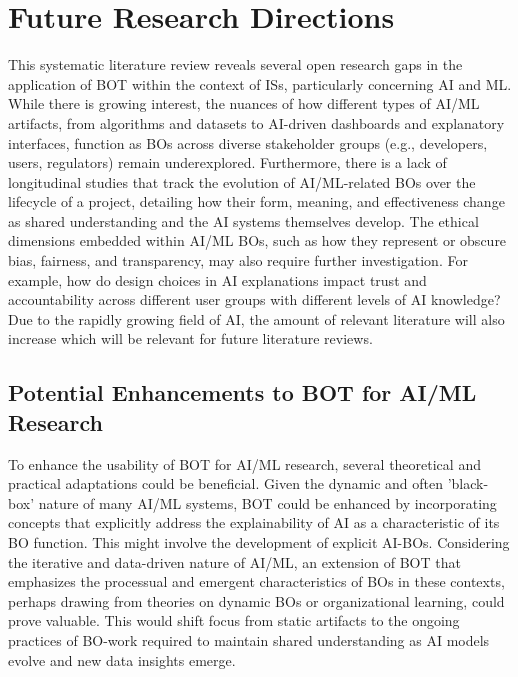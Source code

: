 \documentclass[12pt,oneside]{article}
\begin{document}
\section{Future Research Directions} \label{future-research-directions}

This systematic literature review reveals several open research gaps in the application of \ac{BOT} within the context of \ac{IS}s, particularly concerning \ac{AI} and \ac{ML}. While there is growing interest, the nuances of how different types of \ac{AI}/\ac{ML} artifacts, from algorithms and datasets to \ac{AI}-driven dashboards and explanatory interfaces, function as \ac{BO}s across diverse stakeholder groups (e.g., developers, users, regulators) remain underexplored. Furthermore, there is a lack of longitudinal studies that track the evolution of \ac{AI}/\ac{ML}-related \ac{BO}s over the lifecycle of a project, detailing how their form, meaning, and effectiveness change as shared understanding and the \ac{AI} systems themselves develop. The ethical dimensions embedded within \ac{AI}/\ac{ML} \ac{BO}s, such as how they represent or obscure bias, fairness, and transparency, may also require further investigation. For example, how do design choices in \ac{AI} explanations impact trust and accountability across different user groups with different levels of \ac{AI} knowledge? Due to the rapidly growing field of \ac{AI}, the amount of relevant literature will also increase which will be relevant for future literature reviews.

\subsection{Potential Enhancements to BOT for AI/ML Research} \label{potential-enhancements-to-bot-for-ai-ml-research}

To enhance the usability of \ac{BOT} for \ac{AI}/\ac{ML} research, several theoretical and practical adaptations could be beneficial. Given the dynamic and often 'black-box' nature of many \ac{AI}/\ac{ML} systems, \ac{BOT} could be enhanced by incorporating concepts that explicitly address the explainability of \ac{AI} as a characteristic of its \ac{BO} function. This might involve the development of explicit \ac{AI}-\ac{BO}s. Considering the iterative and data-driven nature of \ac{AI}/\ac{ML}, an extension of \ac{BOT} that emphasizes the processual and emergent characteristics of \ac{BO}s in these contexts, perhaps drawing from theories on dynamic \ac{BO}s or organizational learning, could prove valuable. This would shift focus from static artifacts to the ongoing practices of \ac{BO}-work required to maintain shared understanding as \ac{AI} models evolve and new data insights emerge.
\end{document}
